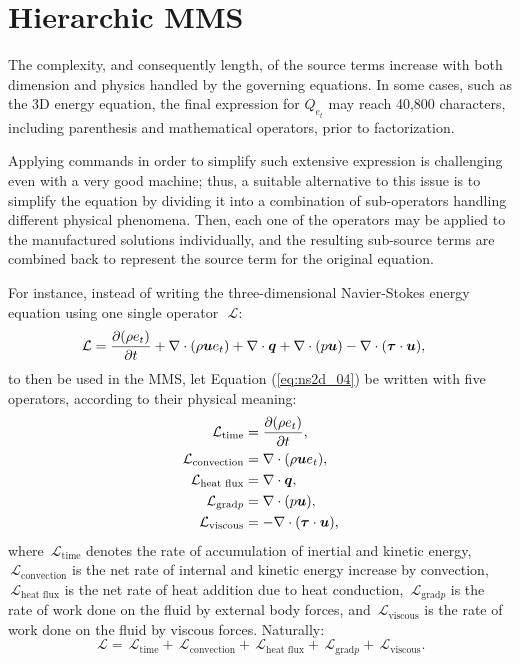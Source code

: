 \documentclass[10pt]{article}
\newcommand{\Diff}[2] {\dfrac{\partial( #1)}{\partial #2}}
\newcommand{\bv}[1]{\ensuremath{\mbox{\boldmath$ #1 $}}}
\newcommand{\Lo}{\,\mathcal{L}}
\newcommand{\convection}{\text{convection}}
\newcommand{\gradp}{\text{grad}p}
\newcommand{\viscous}{\text{viscous}}
\newcommand{\heatflux}{\text{heat flux}}
\begin{document}
\section{Hierarchic MMS}

The complexity, and consequently length, of the source terms increase with both dimension and physics handled by the governing equations. In some cases, such as the 3D energy equation, the final expression for $Q_{e_t}$ may reach 40,800 characters, including parenthesis and mathematical operators, prior to factorization.

Applying commands in order to simplify such extensive expression is challenging even with a very good machine; thus, a suitable alternative to this issue is to simplify the equation by dividing it into a combination of sub-operators handling different physical phenomena. Then, each one of the operators may be applied to the manufactured solutions individually, and the resulting sub-source terms are combined back to represent the source term for the original equation.



For instance, instead of writing the three-dimensional Navier-Stokes energy equation using one single operator~$\Lo$:
\begin{equation}
 \label{eq:ns2d_04}
\begin{split}
\Lo= \Diff{\rho e_t}{t}&+\nabla \cdot (\rho\bv{u}e_t) +\nabla\cdot \bv{q} +  \nabla\cdot(p  \bv{u})  - \nabla \cdot (\bv{\tau} \cdot \bv{u}),
\end{split}
\end{equation}
to then be used in the MMS, let Equation (\ref{eq:ns2d_04}) be written with five operators, according to their physical meaning:
\begin{equation}
 \begin{split}\label{sub01}
  \Lo_{\text{time}}&=\Diff{\rho e_t}{t} ,\\
  \Lo_{\convection}&=\nabla \cdot (\rho\bv{u}e_t),\\
  \Lo_{\heatflux}&=\nabla\cdot \bv{q},\\
  \Lo_{\gradp}&= \nabla\cdot(p  \bv{u}),\\
  \Lo_{\viscous}&=- \nabla \cdot (\bv{\tau} \cdot \bv{u}),
 \end{split}
\end{equation}
where $\Lo_{\text{time}}$ denotes the rate of accumulation of inertial and kinetic energy, $\Lo_{\convection}$ is the net rate of internal and kinetic energy increase by convection, $\Lo_{\heatflux}$ is the net rate of heat addition due to heat conduction, $\Lo_{\gradp}$ is the rate of work done on the fluid by external body forces, and $\Lo_{\viscous}$ is the rate of work done on the fluid by viscous forces. Naturally:
$$\Lo=\Lo_{\text{time}}+\Lo_{\convection}+\Lo_{\heatflux}+\Lo_{\gradp}+\Lo_{\viscous}.$$
\end{document}
